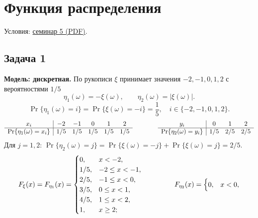 \section{Функция распределения}

\noindent Условия:
\href{run:conditions/sem_05.pdf}{семинар 5 (PDF)}.

\subsection{Задача 1}

\begin{solution}
    \setlength{\abovedisplayskip}{12pt plus 2pt minus 1pt}
    \setlength{\belowdisplayskip}{12pt plus 2pt minus 1pt}
    \setlength{\abovedisplayshortskip}{10pt plus 2pt minus 1pt}
    \setlength{\belowdisplayshortskip}{10pt plus 2pt minus 1pt}
    \textbf{Модель: дискретная.}
    По рукописи $\xi$ принимает значения $-2,-1,0,1,2$
    с вероятностями $1/5$
    \[
        \eta_1(\omega)=-\xi(\omega),\qquad
        \eta_2(\omega)=|\xi(\omega)|.
    \]
    \[
        \Pr\{\eta_1(\omega)=i\}
        =\Pr\{\xi(\omega)=-i\}=\frac15,
        \quad i\in\{-2,-1,0,1,2\}.
    \]
    \[
        \begin{array}{c|ccccc}
            x_i&-2&-1&0&1&2\\\hline
            \Pr\{\eta_1(\omega)=x_i\}&1/5&1/5&1/5&1/5&1/5
        \end{array}
        \hspace{1.4cm}
        \begin{array}{c|ccc}
            y_i&0&1&2\\\hline
            \Pr\{\eta_2(\omega)=y_i\}&1/5&2/5&2/5
        \end{array}
    \]
    Для $j=1,2$:
    $\Pr\{\eta_2(\omega)=j\}
    =\Pr\{\xi(\omega)=-j\}+\Pr\{\xi(\omega)=j\}=2/5$.
    \[
        F_\xi(x)=F_{\eta_1}(x)=
        \begin{cases}
            0,&x<-2,\\
            1/5,&-2\leq x<-1,\\
            2/5,&-1\leq x<0,\\
            3/5,&0\leq x<1,\\
            4/5,&1\leq x<2,\\
            1,&x\geq2;
        \end{cases}
        \hspace{1.6cm}
        F_{\eta_2}(x)=
        \begin{cases}
            0,&x<0,\\

\end{cases}\]
\end{solution}
